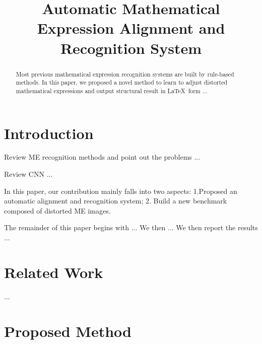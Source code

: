 \documentclass[10pt,conference,a4paper]{IEEEtran}
\begin{document}
	\title{Automatic Mathematical Expression Alignment and Recognition System}
	\author{
	}
	\maketitle
	\begin{abstract}
		Most previous mathematical expression recognition systems are built by rule-based methods. In this paper, we proposed a novel method to learn to adjust distorted mathematical expressions and output structural result in \LaTeX\ form ... 
	\end{abstract}
	
	\IEEEpeerreviewmaketitle
	\section{Introduction}
	Review ME recognition methods and point out the problems ...
		
	Review CNN ...
		
	In this paper, our contribution mainly falls into two aspects: 1.Proposed an automatic alignment and recognition system; 2. Build a new benchmark composed of distorted ME images.
		
	The remainder of this paper begins with ... We then ... We then report the results ...
		
	\section{Related Work}
	...
	
	\section{Proposed Method}
\end{document}
